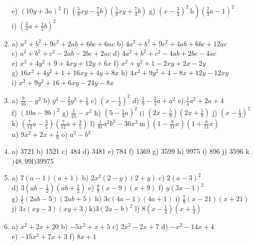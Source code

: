 \documentclass[10pt]{article}
\begin{document}
\begin{enumerate}
e) \((10 y+3 a)^{2}\) f) \(\left(\frac{5}{8} x y-\frac{7}{4} b\right)\left(\frac{5}{8} x y+\frac{7}{4} b\right)\) g) \(\left.\left(x-\frac{3}{4}\right)^{2} \mathrm{~h}\right)\left(\frac{2}{3} a-1\right)^{2}\)\\
i) \(\left(\frac{3}{4} a+\frac{1}{2} b\right)^{2}\)
  \item a) \(a^{2}+b^{2}+9 c^{2}+2 a b+6 b c+6 a c\) b) \(4 a^{2}+b^{2}+9 c^{2}+4 a b+6 b c+12 a c\)\\
c) \(a^{2}+b^{2}+c^{2}-2 a b-2 b c+2 a c\) d) \(4 a^{2}+b^{2}+c^{2}-4 a b+2 b c-4 a c\)\\
e) \(x^{2}+4 y^{2}+9+4 x y+12 y+6 x\) f) \(x^{2}+y^{2}+1-2 x y+2 x-2 y\)\\
g) \(16 x^{2}+4 y^{2}+1+16 x y+4 y+8 x\) h) \(4 x^{2}+9 y^{2}+4-8 x+12 y-12 x y\)\\
i) \(x^{2}+9 y^{2}+16+6 x y-24 y-8 x\)
  \item a) \(\frac{9}{16}-y^{2}\) b) \(y^{4}-\frac{2}{3} y^{2}+\frac{1}{9}\) c) \(\left(x-\frac{1}{2}\right)^{2}\) d) \(\frac{1}{9}-\frac{2}{3} a+a^{2}\) e) \(\frac{1}{4} a^{2}+2 a+4\)\\
f) \((10 a-9 b)^{2}\) g) \(\frac{1}{25}-x^{2}\) h) \(\left(5-\frac{1}{3} a\right)^{2}\) i) \(\left(2 x-\frac{5}{9}\right)\left(2 x+\frac{5}{9}\right)\) j) \(\left(x-\frac{1}{3}\right)^{2}\)\\
k) \(\left(\frac{7}{12} a-\frac{3}{5}\right)\left(\frac{7}{12} a+\frac{3}{5}\right)\) l) \(\left.\frac{1}{81} a^{2} b^{2}-36 x^{2} \mathrm{~m}\right)\left(1-\frac{8}{11} x\right)\left(1+\frac{8}{11} x\right)\)\\
n) \(9 x^{2}+2 x+\frac{1}{9}\) o) \(a^{2}-b^{2}\)
  \item a) 3721 b) 1521 c) 484 d) 3481 e) 784 f) 1369 g) 3599 h) 9975 i) 896 j) 3596 k\() 48,99 \mathrm{l}) 39975\)
  \item a) \(7(a-1)(a+1)\) b) \(2 x^{2}(2-y)(2+y)\) c) \(2(a-3)^{2}\)\\
d) \(3\left(a b-\frac{1}{2}\right)\left(a b+\frac{1}{2}\right)\) e) \(\frac{8}{9}(x-9)(x+9)\) f) \(y(3 x-1)^{2}\)\\
g) \(\frac{1}{5}(2 a b-5)(2 a b+5)\) h) \(3 c(4 a-1)(4 a+1)\) i) \(\frac{7}{9}(x-21)(x+21)\)\\
j) \(3 z(x y-3)(x y+3) \mathrm{k}) 3(2 a-b)^{2}\) l) \(8\left(x-\frac{1}{4}\right)\left(x+\frac{1}{4}\right)\)
  \item a) \(x^{2}+2 x+20\) b) \(-5 x^{2}+x+5\) c) \(2 x^{2}-2 x+7\) d) \(-x^{2}-14 x+4\)\\
e) \(-15 x^{2}+7 x+3\) f) \(8 x+1\)

\end{enumerate}
\end{document}
